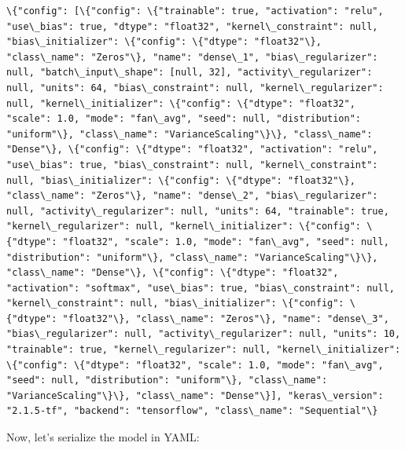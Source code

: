 \documentclass[11pt]{article}
\begin{document}
    \begin{Verbatim}[commandchars=\\\{\}]
\{"config": [\{"config": \{"trainable": true, "activation": "relu", "use\_bias": true, "dtype": "float32", "kernel\_constraint": null, "bias\_initializer": \{"config": \{"dtype": "float32"\}, "class\_name": "Zeros"\}, "name": "dense\_1", "bias\_regularizer": null, "batch\_input\_shape": [null, 32], "activity\_regularizer": null, "units": 64, "bias\_constraint": null, "kernel\_regularizer": null, "kernel\_initializer": \{"config": \{"dtype": "float32", "scale": 1.0, "mode": "fan\_avg", "seed": null, "distribution": "uniform"\}, "class\_name": "VarianceScaling"\}\}, "class\_name": "Dense"\}, \{"config": \{"dtype": "float32", "activation": "relu", "use\_bias": true, "bias\_constraint": null, "kernel\_constraint": null, "bias\_initializer": \{"config": \{"dtype": "float32"\}, "class\_name": "Zeros"\}, "name": "dense\_2", "bias\_regularizer": null, "activity\_regularizer": null, "units": 64, "trainable": true, "kernel\_regularizer": null, "kernel\_initializer": \{"config": \{"dtype": "float32", "scale": 1.0, "mode": "fan\_avg", "seed": null, "distribution": "uniform"\}, "class\_name": "VarianceScaling"\}\}, "class\_name": "Dense"\}, \{"config": \{"dtype": "float32", "activation": "softmax", "use\_bias": true, "bias\_constraint": null, "kernel\_constraint": null, "bias\_initializer": \{"config": \{"dtype": "float32"\}, "class\_name": "Zeros"\}, "name": "dense\_3", "bias\_regularizer": null, "activity\_regularizer": null, "units": 10, "trainable": true, "kernel\_regularizer": null, "kernel\_initializer": \{"config": \{"dtype": "float32", "scale": 1.0, "mode": "fan\_avg", "seed": null, "distribution": "uniform"\}, "class\_name": "VarianceScaling"\}\}, "class\_name": "Dense"\}], "keras\_version": "2.1.5-tf", "backend": "tensorflow", "class\_name": "Sequential"\}

    \end{Verbatim}

    Now, let's serialize the model in YAML:
\end{document}
